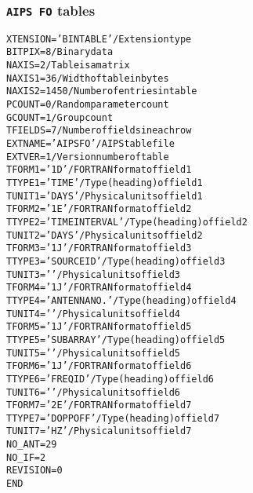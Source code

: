 \documentclass[twoside]{article}
\begin{document}
\subsubsection{{\tt AIPS FO} tables}
\label{Appe:FOtable}
\begin{alltt}
XTENSION= 'BINTABLE'           / Extension type
BITPIX  =                    8 / Binary data
NAXIS   =                    2 / Table is a matrix
NAXIS1  =                   36 / Width of table in bytes
NAXIS2  =                 1450 / Number of entries in table
PCOUNT  =                    0 / Random parameter count
GCOUNT  =                    1 / Group count
TFIELDS =                    7 / Number of fields in each row
EXTNAME = 'AIPS FO '           / AIPS table file
EXTVER  =                    1 / Version number of table
TFORM1  = '1D      '           / FORTRAN format of field  1
TTYPE1  = 'TIME            '   / Type (heading) of field  1
TUNIT1  = 'DAYS    '           / Physical units of field  1
TFORM2  = '1E      '           / FORTRAN format of field  2
TTYPE2  = 'TIME INTERVAL   '   / Type (heading) of field  2
TUNIT2  = 'DAYS    '           / Physical units of field  2
TFORM3  = '1J      '           / FORTRAN format of field  3
TTYPE3  = 'SOURCE ID       '   / Type (heading) of field  3
TUNIT3  = '        '           / Physical units of field  3
TFORM4  = '1J      '           / FORTRAN format of field  4
TTYPE4  = 'ANTENNA NO.     '   / Type (heading) of field  4
TUNIT4  = '        '           / Physical units of field  4
TFORM5  = '1J      '           / FORTRAN format of field  5
TTYPE5  = 'SUBARRAY        '   / Type (heading) of field  5
TUNIT5  = '        '           / Physical units of field  5
TFORM6  = '1J      '           / FORTRAN format of field  6
TTYPE6  = 'FREQ ID         '   / Type (heading) of field  6
TUNIT6  = '        '           / Physical units of field  6
TFORM7  = '2E      '           / FORTRAN format of field  7
TTYPE7  = 'DOPPOFF         '   / Type (heading) of field  7
TUNIT7  = 'HZ      '           / Physical units of field  7
NO_ANT  =           29
NO_IF   =            2
REVISION=            0
END
\end{alltt}
\end{document}
